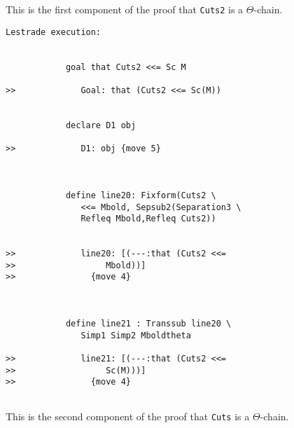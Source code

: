 \documentclass[12pt]{article}
\begin{document}
This is the first component of the proof that {\tt Cuts2} is a $\Theta$-chain.

\begin{verbatim}Lestrade execution:


            goal that Cuts2 <<= Sc M

>>             Goal: that (Cuts2 <<= Sc(M))


            declare D1 obj

>>             D1: obj {move 5}



            define line20: Fixform(Cuts2 \
               <<= Mbold, Sepsub2(Separation3 \
               Refleq Mbold,Refleq Cuts2))


>>             line20: [(---:that (Cuts2 <<=
>>                  Mbold))]
>>               {move 4}



            define line21 : Transsub line20 \
               Simp1 Simp2 Mboldtheta

>>             line21: [(---:that (Cuts2 <<=
>>                  Sc(M)))]
>>               {move 4}


\end{verbatim}

This is the second component of the proof that {\tt Cuts} is a $\Theta$-chain.
\end{document}
